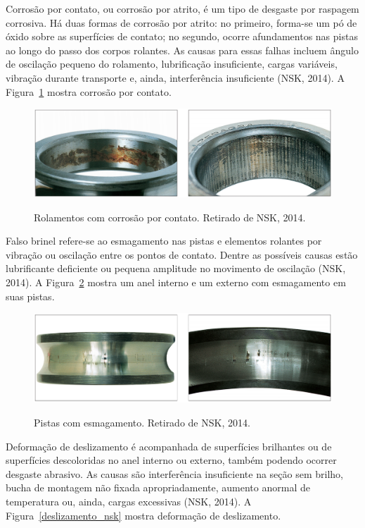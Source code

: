 \documentclass[
	12pt,				
	oneside,			
	a4paper,			
	english,			
	brazil,			
	]{abntex2ppgsi}
\begin{document}
Corrosão por contato, ou corrosão por atrito, é um tipo de desgaste por raspagem corrosiva. Há duas formas de corrosão por atrito: no primeiro, forma-se um pó de óxido sobre as superfícies de contato; no segundo, ocorre afundamentos nas pistas ao longo do passo dos corpos rolantes. As causas para essas falhas incluem ângulo de oscilação pequeno do rolamento, lubrificação insuficiente, cargas variáveis, vibração durante transporte e, ainda, interferência insuficiente (NSK, 2014). A Figura~\ref{corrosao_nsk} mostra corrosão por contato.

\begin{figure}[H]
\centering
\caption {Rolamentos com corrosão por contato. Retirado de NSK, 2014.}
\includegraphics[width=\textwidth,height=\textheight,keepaspectratio]{corrosao_nsk}
\label{corrosao_nsk}
\end{figure}

Falso brinel refere-se ao esmagamento nas pistas e elementos rolantes por vibração ou oscilação entre os pontos de contato. Dentre as possíveis causas estão lubrificante deficiente ou pequena amplitude no movimento de oscilação (NSK, 2014). A Figura~\ref{esmagamento_nsk} mostra um anel interno e um externo com esmagamento em suas pistas.

\begin{figure}[H]
\centering
\caption {Pistas com esmagamento. Retirado de NSK, 2014.}
\includegraphics[width=\textwidth,height=\textheight,keepaspectratio]{esmagamento_nsk}
\label{esmagamento_nsk}
\end{figure}

Deformação de deslizamento é acompanhada de superfícies brilhantes ou de superfícies descoloridas no anel interno ou externo, também podendo ocorrer desgaste abrasivo. As causas são interferência insuficiente na seção sem brilho, bucha de montagem não fixada apropriadamente, aumento anormal de temperatura ou, ainda, cargas excessivas (NSK, 2014). A Figura~\ref{deslizamento_nsk} mostra deformação de deslizamento.
\end{document}
